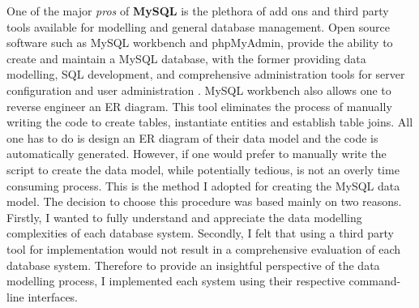 One of the major \textit{pros} of \textbf{MySQL} is the plethora of add ons and third party tools available for modelling and general database management. Open source software such as MySQL workbench and phpMyAdmin, provide the ability to create and maintain a MySQL database, with the former providing data modelling, SQL development, and comprehensive administration tools for server configuration and user administration \cite{mysqlworkbench}. MySQL workbench also allows one to reverse engineer an ER diagram. This tool eliminates the process of manually writing the code to create tables, instantiate entities and establish table joins. All one has to do is design an ER diagram of their data model and the code is automatically generated. However, if one would prefer to manually write the script to create the data model, while potentially tedious, is not an overly time consuming process. This is the method I adopted for creating the MySQL data model. The decision to choose this procedure was based mainly on two reasons. Firstly, I wanted to fully understand and appreciate the data modelling complexities of each database system. Secondly, I felt that using a third party tool for implementation would not result in a comprehensive evaluation of each database system. Therefore to provide an insightful perspective of the data modelling process, I implemented each system using their respective command-line interfaces.





